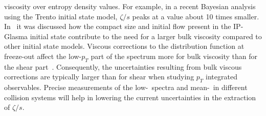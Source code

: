   viscosity over entropy density values. 
For example, in a recent Bayesian analysis using the Trento initial state model, 
  $\zeta/s$ peaks at a value about 10 times smaller. 
In~\cite{Schenke:2018fci} it was discussed how the compact size and initial 
  flow present in the IP-Glasma initial state contribute to the need for a 
  larger bulk viscosity compared to other initial state models. 
Viscous corrections to the distribution function at freeze-out affect the 
  low-$p_T$ part of the spectrum more for bulk viscosity than for the shear 
  part~\cite{Bozek:2009dw,Paquet:2015lta}. 
Consequently, the uncertainties resulting from bulk viscous corrections are 
  typically larger than for shear when studying $p_T$ integrated observables. 
Precise measurements of the low-\pt\ spectra and mean-\pt\ in different 
  collision systems  will help in lowering the current uncertainties
  in the extraction of $\zeta/s$.



